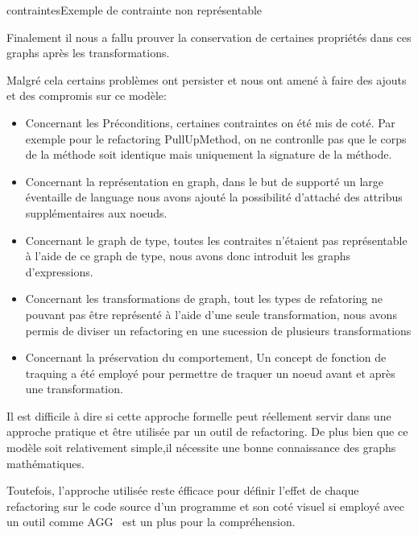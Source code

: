 \documentclass[a4paper, 12pt]{article}
\begin{document}
\begin{figu}{contraintes}{Exemple de contrainte non représentable}
{  Finalement il nous a fallu prouver la conservation de certaines propriétés dans ces graphs après les transformations.

  Malgré cela certains problèmes ont persister et nous ont amené à faire des ajouts et des compromis sur ce modèle:

  \begin{itemize}[label=\textbullet]
    \item Concernant les Préconditions, certaines contraintes on été mis de coté. Par exemple pour le refactoring PullUpMethod, on ne contronlle pas que le corps de la méthode soit identique mais uniquement la signature de la méthode.

    \item Concernant la représentation en graph, dans le but de supporté un large éventaille de language nous avons ajouté la possibilité d'attaché des attribus supplémentaires aux noeuds.

    \item Concernant le graph de type, toutes les contraites n'étaient pas représentable à l'aide de ce graph de type, nous avons donc introduit les graphs d'expressions.

    \item Concernant les transformations de graph, tout les types de refatoring ne pouvant pas être représenté à l'aide d'une seule transformation, nous avons permis de diviser un refactoring en une sucession de plusieurs transformations

    \item Concernant la préservation du comportement, Un concept de fonction de traquing a été employé pour permettre de traquer un noeud avant et après une transformation.
  \end{itemize}

  Il est difficile à dire si cette approche formelle peut réellement servir dans une approche pratique et être utilisée par un outil de refactoring.
  De plus bien que ce modèle soit relativement simple,il nécessite une bonne connaissance des graphs mathématiques.

  Toutefois, l'approche utilisée reste éfficace pour définir l'effet de chaque refactoring sur le code source d'un programme et son coté visuel si employé avec un outil comme AGG~\cite{aggSite} est un plus pour la compréhension.

  \newpage

  \begin{thebibliography}{9}


\end{thebibliography}}
\end{figu}
\end{document}
